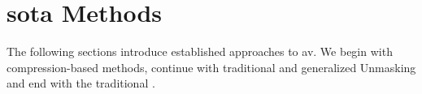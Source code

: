 \section{\Acl{sota} Methods}

The following sections introduce established approaches to \ac{av}.
We begin with compression-based methods, continue with traditional and generalized Unmasking and end with the traditional \impAppr{}.




  
